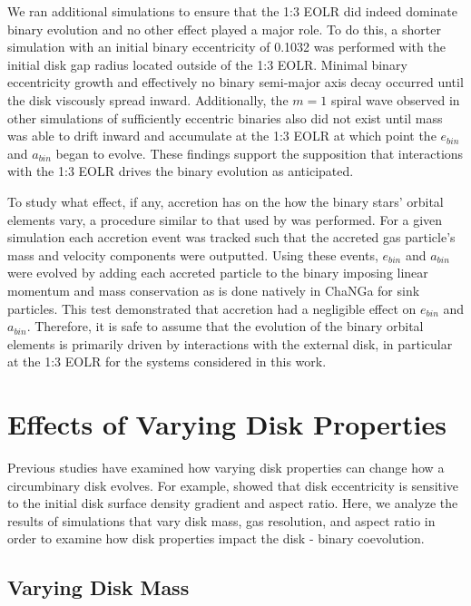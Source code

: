 We ran additional simulations to ensure that  the 1:3 EOLR did indeed dominate binary
evolution and no other effect played a major role.  To do this, a shorter simulation with an initial binary eccentricity of 0.1032 was performed
with the initial disk gap radius located outside of the 1:3 EOLR.
Minimal binary eccentricity growth and effectively no binary semi-major
axis decay occurred until the disk viscously spread inward.  Additionally, the $m = 1$ spiral wave observed in other simulations of sufficiently eccentric binaries also did not exist until mass was able to drift inward and accumulate at the 1:3 EOLR at which point the $e_{bin}$ and $a_{bin}$ began to evolve.  These findings support the supposition that interactions with the 1:3 EOLR drives the binary evolution as anticipated.

To study what effect, if any, accretion has on the how the binary stars' orbital elements vary, a procedure similar to that used by \citet{Roedig2012} 
was performed.  For a given simulation each accretion event was tracked such that the accreted gas particle's mass and velocity components were
outputted.  Using these events, $e_{bin}$ and $a_{bin}$ were evolved by adding each accreted particle to the binary imposing linear
momentum and mass conservation as is done natively in ChaNGa for sink particles.  This test demonstrated that accretion 
had a negligible effect on $e_{bin}$ and $a_{bin}$.  Therefore, it is safe to assume that the evolution of the binary orbital elements is primarily driven by interactions with the external disk, in particular at the 1:3 EOLR for the systems considered in this work.


\section{Effects of Varying Disk Properties} \label{CBDisk:sec:VaryingDiscProps}

Previous studies have examined how varying disk properties can change
how a circumbinary disk evolves.  For example, \citet{Lines2015} showed
that disk eccentricity is sensitive to the initial disk surface
density gradient and aspect ratio.  Here, we analyze the results of simulations that vary disk mass, gas resolution, and
aspect ratio in order to examine how disk properties impact the disk - binary coevolution.


\subsection{Varying Disk Mass} \label{CBDisk:sec:VaryingDiscMass}

